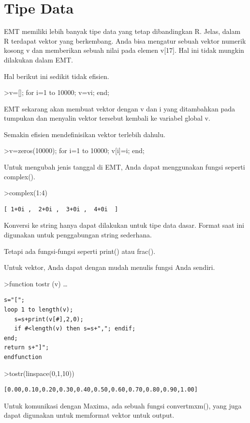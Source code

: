 \documentclass[
]{book}
\begin{document}
\section{Tipe Data}\label{tipe-data}

EMT memiliki lebih banyak tipe data yang tetap dibandingkan R. Jelas, dalam R terdapat vektor yang berkembang. Anda bisa mengatur sebuah vektor numerik kosong v dan memberikan sebuah nilai pada elemen v{[}17{]}. Hal ini tidak mungkin dilakukan dalam EMT.

Hal berikut ini sedikit tidak efisien.

\textgreater v={[}{]}; for i=1 to 10000; v=v\textbar i; end;

EMT sekarang akan membuat vektor dengan v dan i yang ditambahkan pada tumpukan dan menyalin vektor tersebut kembali ke variabel global v.

Semakin efisien mendefinisikan vektor terlebih dahulu.

\textgreater v=zeros(10000); for i=1 to 10000; v{[}i{]}=i; end;

Untuk mengubah jenis tanggal di EMT, Anda dapat menggunakan fungsi seperti complex().

\textgreater complex(1:4)

\begin{verbatim}
[ 1+0i ,  2+0i ,  3+0i ,  4+0i  ]
\end{verbatim}

Konversi ke string hanya dapat dilakukan untuk tipe data dasar. Format saat ini digunakan untuk penggabungan string sederhana.

Tetapi ada fungsi-fungsi seperti print() atau frac().

Untuk vektor, Anda dapat dengan mudah menulis fungsi Anda sendiri.

\textgreater function tostr (v) \ldots{}

\begin{verbatim}
s="[";
loop 1 to length(v);
   s=s+print(v[#],2,0);
   if #<length(v) then s=s+","; endif;
end;
return s+"]";
endfunction
\end{verbatim}

\textgreater tostr(linspace(0,1,10))

\begin{verbatim}
[0.00,0.10,0.20,0.30,0.40,0.50,0.60,0.70,0.80,0.90,1.00]
\end{verbatim}

Untuk komunikasi dengan Maxima, ada sebuah fungsi convertmxm(), yang juga dapat digunakan untuk memformat vektor untuk output.
\end{document}
